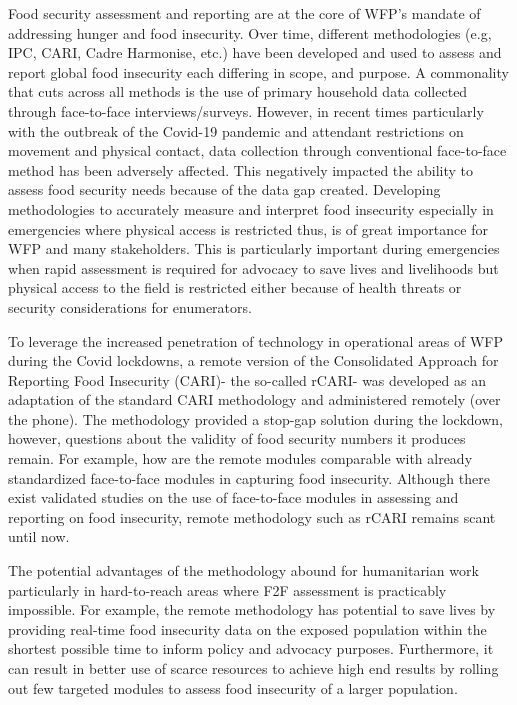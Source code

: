 \documentclass[11pt,harvard]{article}
\begin{document}
	Food security assessment and reporting are at the core of WFP’s mandate of addressing hunger and food insecurity. Over time, different methodologies (e.g, IPC, CARI, Cadre Harmonise, etc.) have been developed and used to assess and report global food insecurity each differing in scope, and purpose. A commonality that cuts across all methods is the use of primary household data collected through face-to-face interviews/surveys. However, in recent times particularly with the outbreak of the Covid-19 pandemic and attendant restrictions on movement and physical contact, data collection through conventional face-to-face method has been adversely affected. This negatively impacted the ability to assess food security needs because of the data gap created. Developing methodologies to accurately measure and interpret food insecurity especially in emergencies where physical access is restricted thus, is of great importance for WFP and many stakeholders. This is particularly important during emergencies when rapid assessment is required for advocacy to save lives and livelihoods but physical access to the field is restricted either because of health threats or security considerations for enumerators. 
	
	To leverage the increased penetration of technology in operational areas of WFP during the Covid lockdowns, a remote version of the Consolidated Approach for Reporting Food Insecurity (CARI)- the so-called rCARI- was developed as an adaptation of the standard CARI methodology and administered remotely (over the phone). The methodology provided a stop-gap solution during the lockdown, however, questions about the validity of food security numbers it produces remain. For example, how are the remote modules comparable with already standardized face-to-face modules in capturing food insecurity. Although there exist validated studies on the use of face-to-face modules in assessing and reporting on food insecurity, remote methodology such as rCARI remains scant until now. 
	
	The potential advantages of the methodology abound for humanitarian work particularly in hard-to-reach areas where F2F assessment is practicably impossible. For example, the remote methodology has potential to save lives by providing real-time food insecurity data on the exposed population within the shortest possible time to inform policy and advocacy purposes. Furthermore, it can result in better use of scarce resources to achieve high end results by rolling out few targeted modules to assess food insecurity of a larger population.  	
	
\end{document}
